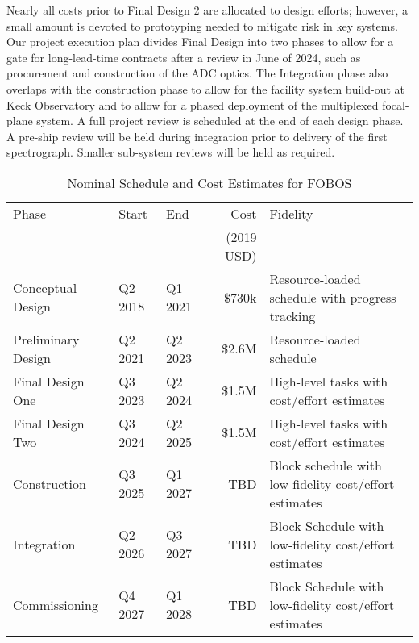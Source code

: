 Nearly all costs prior to Final Design 2 are allocated to design
efforts; however, a small amount is devoted to prototyping needed to
mitigate risk in key systems.  Our project execution plan divides Final
Design into two phases to allow for a gate for long-lead-time contracts
after a review in June of 2024, such as procurement and construction of
the ADC optics.  The Integration phase also overlaps with the
construction phase to allow for the facility system build-out at Keck
Observatory and to allow for a phased deployment of the multiplexed
focal-plane system.  A full project review is scheduled at the end of
each design phase.  A pre-ship review will be held during integration
prior to delivery of the first spectrograph.   Smaller sub-system
reviews will be held as required.

\begin{table}[h!]
\centering
\footnotesize
\caption{Nominal Schedule and Cost Estimates for FOBOS}
\label{tab:cost}
\vspace*{-10pt}
\begin{tabular}{l | l l r l }
\hline
Phase              &  Start  &     End &         Cost & Fidelity \\
                   &         &         &  (2019 USD) &  \\
\hline
\hline
Conceptual Design  & Q2 2018 & Q1 2021 &   \$730k & Resource-loaded schedule with progress tracking \\
Preliminary Design & Q2 2021 & Q2 2023 &  \$2.6M & Resource-loaded schedule \\
Final Design One   & Q3 2023 & Q2 2024 &  \$1.5M & High-level tasks with cost/effort estimates \\
Final Design Two   & Q3 2024 & Q2 2025 &  \$1.5M & High-level tasks with cost/effort estimates \\
Construction       & Q3 2025 & Q1 2027 & TBD & Block schedule with low-fidelity cost/effort estimates \\
Integration        & Q2 2026 & Q3 2027 & TBD & Block Schedule with low-fidelity cost/effort estimates \\
Commissioning      & Q4 2027 & Q1 2028 &   TBD & Block Schedule with low-fidelity cost/effort estimates \\
\hline
\end{tabular}
\end{table}


